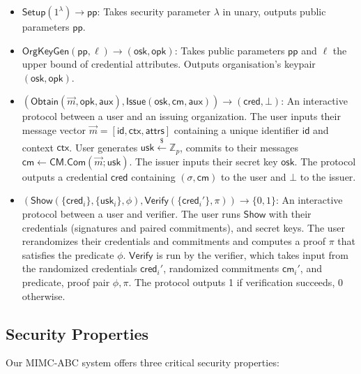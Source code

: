 \begin{definition}
\begin{itemize}
    \item $\mathsf{Setup}(1^\lambda) \to \mathsf{pp}$: Takes security parameter $\lambda$ in unary, outputs public parameters $\mathsf{pp}$.
    
    \item $\mathsf{OrgKeyGen}(\mathsf{pp}, \ell) \to (\mathsf{osk}, \mathsf{opk})$: Takes public parameters $\mathsf{pp}$ and $\ell$ the upper bound of credential attributes. Outputs organisation's keypair $(\mathsf{osk}, \mathsf{opk})$.
       
    \item $(\mathsf{Obtain}(\vec{m}, \mathsf{opk}, \mathsf{aux}), \mathsf{Issue}(\mathsf{osk}, \mathsf{cm}, \mathsf{aux})) \rightarrow (\mathsf{cred}, \bot)$: An interactive protocol between a user and an issuing organization. The user inputs their message vector $\vec{m} = [\mathsf{id}, \mathsf{ctx}, \mathsf{attrs}]$ containing a unique identifier $\mathsf{id}$ and context $\mathsf{ctx}$. User generates $\mathsf{usk} \stackrel{\$}{\leftarrow} \mathbb{Z}_p$, commits to their messages $\mathsf{cm} \gets \mathsf{CM.Com}(\vec{m}; \mathsf{usk})$. The issuer inputs their secret key $\mathsf{osk}$. The protocol outputs a credential $\mathsf{cred}$ containing $(\sigma, \mathsf{cm})$ to the user and $\bot$ to the issuer.    
    
    \item $(\mathsf{Show}(\{\mathsf{cred}_i\}, \{\mathsf{usk}_i\}, \phi), \mathsf{Verify}(\{\mathsf{cred}_i'\}, \pi)) \rightarrow \{0,1\}$: An interactive protocol between a user and verifier. The user runs $\mathsf{Show}$ with their credentials (signatures and paired commitments), and secret keys. The user rerandomizes their credentials and commitments and computes a proof $\pi$ that satisfies the predicate $\phi$.
    $\mathsf{Verify}$ is run by the verifier, which takes input from the randomized credentials $\mathsf{cred}_i'$, randomized commitments $\mathsf{cm}_i'$, and predicate, proof pair $\phi, \pi$. The protocol outputs 1 if verification succeeds, 0 otherwise.
\end{itemize}
\end{definition}

\subsection{Security Properties}
Our MIMC-ABC system offers three critical security properties:


